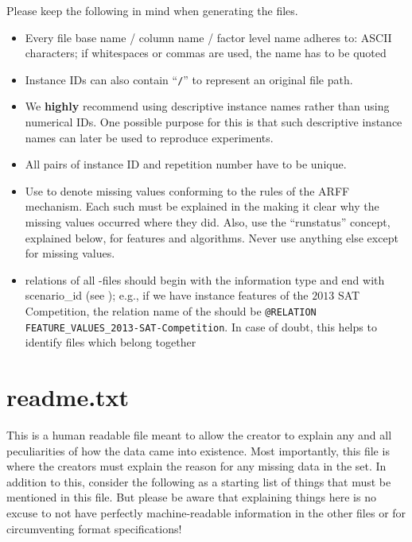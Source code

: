 Please keep the following in mind when generating the files.

\begin{itemize}
  	\item Every file base name / column name / factor level name adheres to: ASCII characters; if whitespaces or 
		commas are used, the name has to be quoted
	\item Instance IDs can also contain ``\texttt{/}'' to represent an original file path.
	\item We \textbf{highly} recommend using descriptive instance names rather than using numerical IDs. One 
		possible purpose for this is that such descriptive instance names can later be used to reproduce experiments.
	\item All pairs of instance ID and repetition number have to be unique.
  	\item Use \qm to denote missing values conforming to the rules of the ARFF mechanism. Each such \qm must be
		explained in the  making it clear why the missing values occurred where they did. Also, 
		use the \enquote{runstatus} concept, explained below, for features and algorithms. Never use anything else
		except \qm for missing values. 
    	\item relations of all -files should begin with the information type and end with scenario\_id 
		(see );  e.g., if we have instance features of the $2013$ SAT Competition, the 
		relation name of the  should be 
		\texttt{@RELATION FEATURE\_VALUES\_2013-SAT-Competition}. In case of doubt, this helps to identify 
		files which belong together
\end{itemize}
  
  
\section{readme.txt}

This is a human readable file meant to allow the creator to explain any and all peculiarities of how the data came 
into existence. Most importantly, this file is where the creators must explain the reason for any missing data in the
set. In addition to this, consider the following as a starting list of things that must be mentioned in this file. But please 
be aware that explaining things here is no excuse to not have perfectly machine-readable information in the other 
files or for circumventing format specifications!

